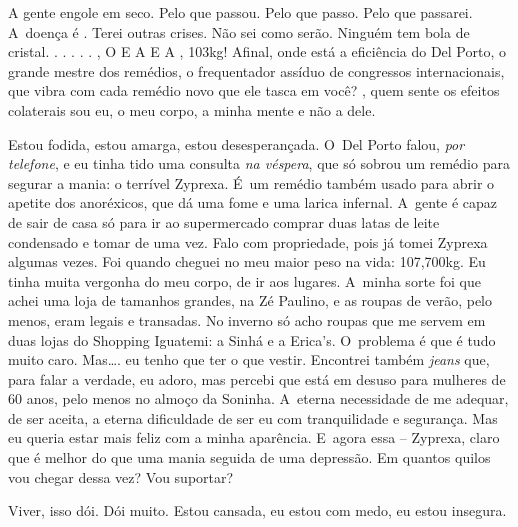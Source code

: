 A gente engole em seco. Pelo que passou. Pelo que passo. Pelo que
passarei. A~doença é . Terei outras crises. Não sei como serão.
Ninguém tem bola de cristal.  .  .  
 .   .     
  .      
,  O  E A     E A ,
103kg! Afinal, onde está a eficiência do Del Porto, o grande mestre dos
remédios, o frequentador assíduo de congressos internacionais, que vibra
com cada remédio novo que ele tasca em você?    , quem
sente os efeitos colaterais sou eu, o meu corpo, a minha mente e não a
dele.

Estou fodida, estou amarga, estou desesperançada. O~Del Porto falou,
\emph{por telefone}, e eu tinha tido uma consulta \emph{na véspera}, que
só sobrou um remédio para segurar a mania: o terrível Zyprexa. É~um
remédio também usado para abrir o apetite dos anoréxicos, que dá uma
fome e uma larica infernal. A~gente é capaz de sair de casa só para ir
ao supermercado comprar duas latas de leite condensado e tomar de uma
vez. Falo com propriedade, pois já tomei Zyprexa algumas vezes. Foi
quando cheguei no meu maior peso na vida: 107,700kg. Eu tinha muita
vergonha do meu corpo, de ir aos lugares. A~minha sorte foi que achei
uma loja de tamanhos grandes, na Zé Paulino, e as roupas de verão, pelo
menos, eram legais e transadas. No inverno só acho roupas que me servem
em duas lojas do Shopping Iguatemi: a Sinhá e a Erica's. O~problema é
que é tudo muito caro. Mas…. eu tenho que ter o que vestir.
Encontrei também \emph{jeans} que, para falar a verdade, eu adoro, mas
percebi que está em desuso para mulheres de 60 anos, pelo menos no
almoço da Soninha. A~eterna necessidade de me adequar, de ser aceita, a
eterna dificuldade de ser eu com tranquilidade e segurança. Mas eu
queria estar mais feliz com a minha aparência. E~agora essa -- Zyprexa,
claro que é melhor do que uma mania seguida de uma depressão. Em quantos
quilos vou chegar dessa vez? Vou suportar?

Viver, isso dói. Dói muito. Estou cansada, eu estou com medo, eu estou
insegura.

